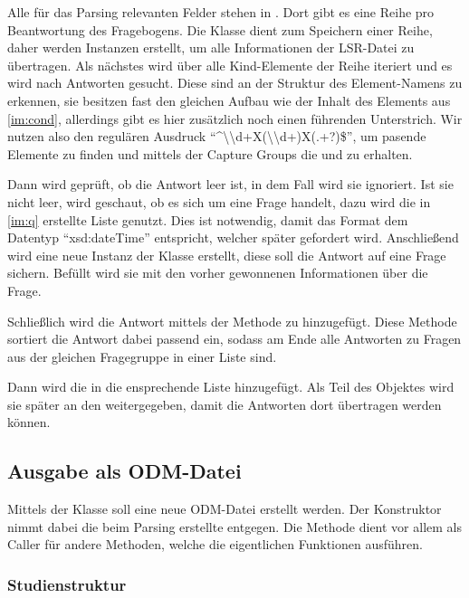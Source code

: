 Alle für das Parsing relevanten Felder stehen in . Dort gibt es eine Reihe pro Beantwortung des Fragebogens.
Die Klasse  dient zum Speichern einer Reihe, daher werden Instanzen erstellt, um alle Informationen der LSR-Datei zu übertragen.
Als nächstes wird über alle Kind-Elemente der Reihe iteriert und es wird nach Antworten gesucht.
Diese sind an der Struktur des Element-Namens zu erkennen, sie besitzen fast den gleichen Aufbau wie der Inhalt des Elements  aus \cref{im:cond}, allerdings gibt es hier zusätzlich noch einen führenden Unterstrich.
Wir nutzen also den regulären Ausdruck \enquote{\textasciicircum\textunderscore\textbackslash\textbackslash d+X(\textbackslash\textbackslash d+)X(.+?)\$}, um pasende Elemente zu finden und mittels der Capture Groups die  und  zu erhalten.

Dann wird geprüft, ob die Antwort leer ist, in dem Fall wird sie ignoriert.
Ist sie nicht leer, wird geschaut, ob es sich um eine  Frage handelt, dazu wird die in \cref{im:q} erstellte Liste genutzt. Dies ist notwendig, damit das Format dem Datentyp \enquote{xsd:dateTime} entspricht, welcher später gefordert wird.
Anschließend wird eine neue Instanz der Klasse  erstellt, diese soll die Antwort auf eine Frage sichern.
Befüllt wird sie mit den vorher gewonnenen Informationen über die Frage.


Schließlich wird die Antwort mittels der Methode  zu  hinzugefügt.
Diese Methode sortiert die Antwort dabei passend ein, sodass am Ende alle Antworten zu Fragen aus der gleichen Fragegruppe in einer Liste sind.

Dann wird die  in die ensprechende Liste hinzugefügt.
Als Teil des Objektes  wird sie später an den  weitergegeben, damit die Antworten dort übertragen werden können.

\subsection{Ausgabe als ODM-Datei}

Mittels der Klasse  soll eine neue ODM-Datei erstellt werden. Der Konstruktor nimmt dabei die beim Parsing erstellte  entgegen.
Die Methode  dient vor allem als Caller für andere Methoden, welche die eigentlichen Funktionen ausführen.

\subsubsection{Studienstruktur}

